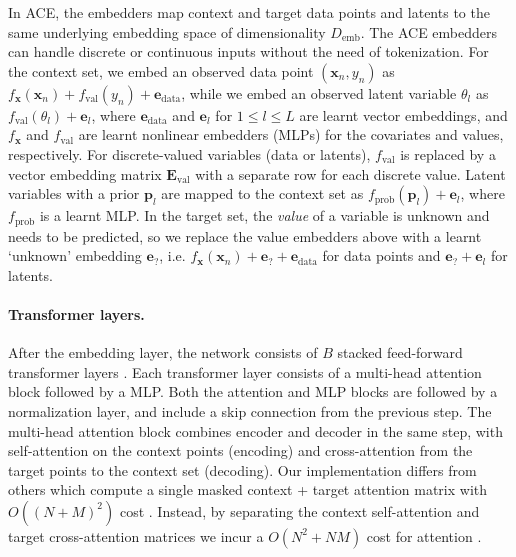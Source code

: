\documentclass[twoside]{article}
\newcommand{\e}{\mathbf{e}}
\newcommand{\E}{\mathbf{E}}
\newcommand{\x}{\mathbf{x}}
\begin{document}
In ACE, the embedders map context and target data points and latents to the same underlying embedding space of dimensionality $D_\text{emb}$. The ACE embedders can handle discrete or continuous inputs without the need of tokenization.
For the context set, we embed an observed data point $(\x_n, y_n)$ as $f_\x(\x_n) + f_\text{val}(y_n) + \e_\text{data}$, while we embed an observed latent variable $\theta_l$ as $f_\text{val}(\theta_l) + \e_l$, where $\e_\text{data}$ and $\e_l$ for $1\le l \le L$ are learnt vector embeddings, and $f_\x$ and $f_\text{val}$ are learnt nonlinear embedders (MLPs) for the covariates and values, respectively.
For discrete-valued variables (data or latents), $f_\text{val}$ is replaced by a vector embedding matrix $\E_\text{val}$ with a separate row for each discrete value.
Latent variables with a prior $\mathbf{p}_l$ are mapped to the context set as $f_\text{prob}(\mathbf{p}_l) + \e_l$, where $f_\text{prob}$ is a learnt MLP.
In the target set, the \emph{value} of a variable is unknown and needs to be predicted, so we replace the value embedders above with a learnt `unknown' embedding $\e_?$, i.e. $f_\x(\x_n) + \e_? + \e_\text{data}$ for data points and $\e_? + \e_l$ for latents.


\vspace{-0.25em}
\paragraph{Transformer layers.}

After the embedding layer, the network consists of $B$ stacked feed-forward transformer layers \citep{vaswani2017attention}.
Each transformer layer consists of a multi-head attention block followed by a MLP. Both the attention and MLP blocks are followed by a normalization layer, and include a skip connection from the previous step. The multi-head attention block combines encoder and decoder in the same step, with self-attention on the context points (encoding) and cross-attention from the target points to the context set (decoding). Our implementation differs from others which compute a single masked context + target attention matrix with $O((N + M)^2)$ cost \citep{nguyen2022transformer,muller2022transformers}. Instead, by separating the context self-attention and target cross-attention matrices we incur a $O(N^2 + NM)$ cost for attention \citep{feng2023latent}.


\vspace{-0.25em}
\end{document}
